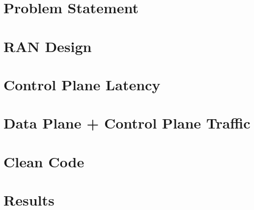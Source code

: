 \documentclass[a4paper,12pt]{report}
\begin{document}
\chapter{Problem Statement \label{chap:ProblemStatement}}


\chapter{RAN Design\label{chap:RANDesign}}


\chapter{Control Plane Latency\label{chap:CPLatency}}


\chapter{Data Plane + Control Plane Traffic\label{chap:CPDPTraffic}}


\chapter{Clean Code\label{chap:CleanCode}}



\chapter{Results\label{chap:Results}}




\begin{spacing}{1}


\end{spacing}
\end{document}
